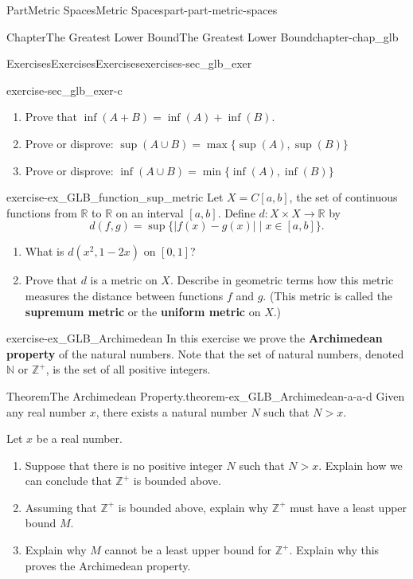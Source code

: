 \documentclass[oneside,10pt,]{book}
\newcommand{\terminology}[1]{\textbf{#1}}
\numberwithin{equation}{chapter}
\newcommand{\Z}{\mathbb{Z}}
\newcommand{\N}{\mathbb{N}}
\newcommand{\R}{\mathbb{R}}
\newcommand{\gt}{>}
\begin{document}
\begin{partptx}{Part}{Metric Spaces}{}{Metric Spaces}{}{}{part-part-metric-spaces}
\begin{chapterptx}{Chapter}{The Greatest Lower Bound}{}{The Greatest Lower Bound}{}{}{chapter-chap_glb}
\begin{exercises-section}{Exercises}{Exercises}{}{Exercises}{}{}{exercises-sec_glb_exer}
\begin{divisionexercise}{3}{}{}{exercise-sec_glb_exer-c}
\begin{enumerate}[font=\bfseries,label=(\alph*),ref=\alph*]
\begin{enumerate}[font=\bfseries,label=(\roman*),ref=\theenumi.\roman*]
\end{enumerate}%
\item{}Prove that \(\inf(A+B) = \inf(A) + \inf(B)\).%
\item{}Prove or disprove: \(\sup(A \cup B) = \max\{\sup(A), \sup(B)\}\)%
\item{}Prove or disprove: \(\inf(A \cup B) = \min\{\inf(A), \inf(B)\}\)%
\end{enumerate}%
\end{divisionexercise}%
\begin{divisionexercise}{4}{}{}{exercise-ex_GLB_function_sup_metric}%
Let \(X = C[a,b]\), the set of continuous functions from \(\R\) to \(\R\) on an interval \([a,b]\). Define \(d: X \times X \to \R\) by%
\begin{equation*}
d(f,g) = \sup\{|f(x)-g(x)| \mid x \in [a,b]\}\text{.}
\end{equation*}
%
\begin{enumerate}[font=\bfseries,label=(\alph*),ref=\alph*]%
\item{}What is \(d(x^2,1-2x)\) on \([0,1]\)?%
\item{}Prove that \(d\) is a metric on \(X\). Describe in geometric terms how this metric measures the distance between functions \(f\) and \(g\). (This metric is called the \terminology{supremum metric} or the \terminology{uniform metric} on \(X\).)%
\end{enumerate}%
\end{divisionexercise}%
\begin{divisionexercise}{5}{}{}{exercise-ex_GLB_Archimedean}%
In this exercise we prove the \terminology{Archimedean property} of the natural numbers. Note that the set of natural numbers, denoted \(\N\) or \(\Z^+\), is the set of all positive integers. \begin{theorem}{Theorem}{The Archimedean Property.}{}{theorem-ex_GLB_Archimedean-a-a-d}%
Given any real number \(x\), there exists a natural number \(N\) such that \(N \gt x\).%
\end{theorem}
 Let \(x\) be a real number.%
\begin{enumerate}[font=\bfseries,label=(\alph*),ref=\alph*]%
\item{}Suppose that there is no positive integer \(N\) such that \(N > x\). Explain how we can conclude that \(\Z^+\) is bounded above.%
\item{}Assuming that \(\Z^+\) is bounded above, explain why \(\Z^+\) must have a least upper bound \(M\).%
\item{}Explain why \(M\) cannot be a least upper bound for \(\Z^+\). Explain why this proves the Archimedean property.%

\end{enumerate}
\end{divisionexercise}
\end{exercises-section}
\end{chapterptx}
\end{partptx}
\end{document}
